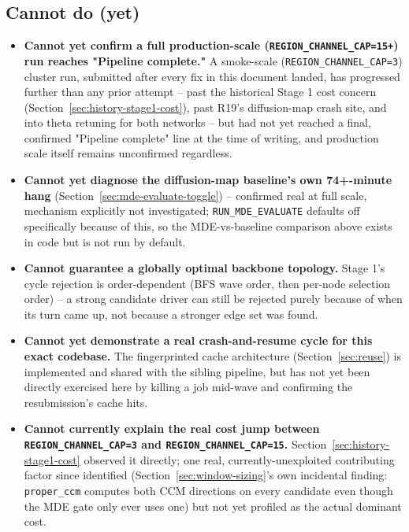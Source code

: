 \documentclass[11pt]{article}
\begin{document}
\subsection{Cannot do (yet)}
\begin{itemize}
  \item \textbf{Cannot yet confirm a full production-scale (\texttt{REGION\_CHANNEL\_CAP=15+}) run reaches "Pipeline complete."} A smoke-scale (\texttt{REGION\_CHANNEL\_CAP=3}) cluster run, submitted after every fix in this document landed, has progressed further than any prior attempt -- past the historical Stage 1 cost concern (Section~\ref{sec:history-stage1-cost}), past R19's diffusion-map crash site, and into theta retuning for both networks -- but had not yet reached a final, confirmed "Pipeline complete" line at the time of writing, and production scale itself remains unconfirmed regardless.
  \item \textbf{Cannot yet diagnose the diffusion-map baseline's own 74+-minute hang} (Section~\ref{sec:mde-evaluate-toggle}) -- confirmed real at full scale, mechanism explicitly not investigated; \texttt{RUN\_MDE\_EVALUATE} defaults off specifically because of this, so the MDE-vs-baseline comparison above exists in code but is not run by default.
  \item \textbf{Cannot guarantee a globally optimal backbone topology.} Stage 1's cycle rejection is order-dependent (BFS wave order, then per-node selection order) -- a strong candidate driver can still be rejected purely because of when its turn came up, not because a stronger edge set was found.
  \item \textbf{Cannot yet demonstrate a real crash-and-resume cycle for this exact codebase.} The fingerprinted cache architecture (Section~\ref{sec:reuse}) is implemented and shared with the sibling pipeline, but has not yet been directly exercised here by killing a job mid-wave and confirming the resubmission's cache hits.
  \item \textbf{Cannot currently explain the real cost jump between \texttt{REGION\_CHANNEL\_CAP=3} and \texttt{REGION\_CHANNEL\_CAP=15}.} Section~\ref{sec:history-stage1-cost} observed it directly; one real, currently-unexploited contributing factor since identified (Section~\ref{sec:window-sizing}'s own incidental finding: \texttt{proper\_ccm} computes both CCM directions on every candidate even though the MDE gate only ever uses one) but not yet profiled as the actual dominant cost.
\end{itemize}
\end{document}
